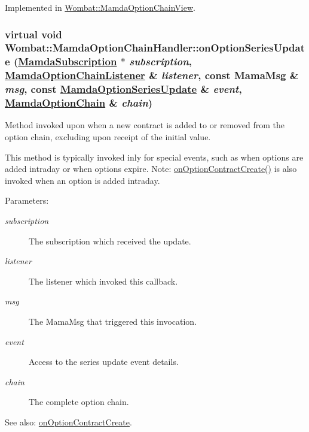 Implemented in \hyperlink{classWombat_1_1MamdaOptionChainView_ebb618efb4207ac512e1a1dda0b5cc73}{Wombat::Mamda\-Option\-Chain\-View}.\hypertarget{classWombat_1_1MamdaOptionChainHandler_0f2ed7a5229483349b2c26330a0afb03}{
\subsubsection[onOptionSeriesUpdate]{\setlength{\rightskip}{0pt plus 5cm}virtual void Wombat::Mamda\-Option\-Chain\-Handler::on\-Option\-Series\-Update (\hyperlink{classWombat_1_1MamdaSubscription}{Mamda\-Subscription} $\ast$ {\em subscription}, \hyperlink{classWombat_1_1MamdaOptionChainListener}{Mamda\-Option\-Chain\-Listener} \& {\em listener}, const Mama\-Msg \& {\em msg}, const \hyperlink{classWombat_1_1MamdaOptionSeriesUpdate}{Mamda\-Option\-Series\-Update} \& {\em event}, \hyperlink{classWombat_1_1MamdaOptionChain}{Mamda\-Option\-Chain} \& {\em chain})}}
\label{classWombat_1_1MamdaOptionChainHandler_0f2ed7a5229483349b2c26330a0afb03}


Method invoked upon when a new contract is added to or removed from the option chain, excluding upon receipt of the initial value. 

This method is typically invoked inly for special events, such as when options are added intraday or when options expire. Note: \hyperlink{classWombat_1_1MamdaOptionChainHandler_a3cfccdc231b70111443aa096cf9a606}{on\-Option\-Contract\-Create()} is also invoked when an option is added intraday.

\begin{Desc}
\item[Parameters:]
\begin{description}
\item[{\em subscription}]The subscription which received the update. \item[{\em listener}]The listener which invoked this callback. \item[{\em msg}]The Mama\-Msg that triggered this invocation. \item[{\em event}]Access to the series update event details. \item[{\em chain}]The complete option chain. \end{description}
\end{Desc}
\begin{Desc}
\item[See also:]\hyperlink{classWombat_1_1MamdaOptionChainHandler_a3cfccdc231b70111443aa096cf9a606}{on\-Option\-Contract\-Create}. \end{Desc}


